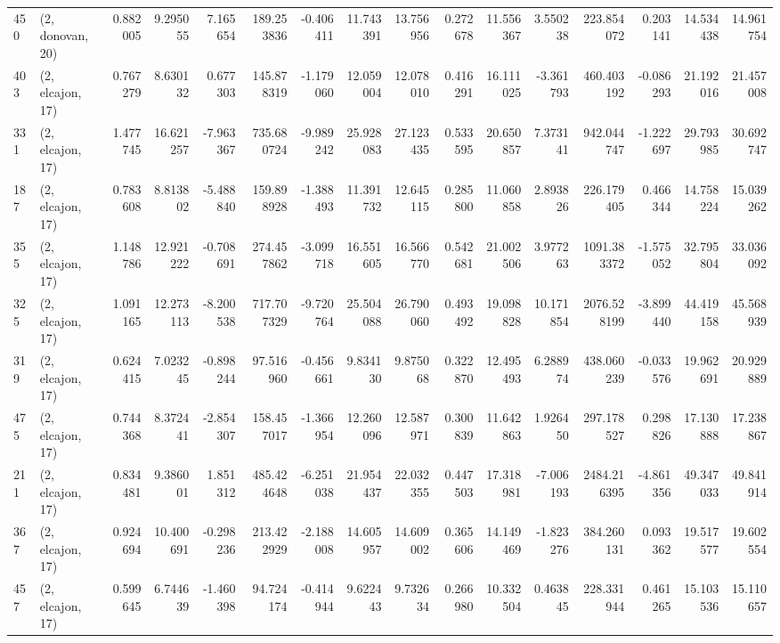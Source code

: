 \begin{tabular}{llrrrrrrrrrrrrrr}
450 &  (2, donovan, 20) &   0.882005 &   9.295055 &   7.165654 &   189.253836 &  -0.406411 &  11.743391 &  13.756956 &  0.272678 &  11.556367 &   3.550238 &   223.854072 &   0.203141 &  14.534438 &  14.961754 \\
403 &  (2, elcajon, 17) &   0.767279 &   8.630132 &   0.677303 &   145.878319 &  -1.179060 &  12.059004 &  12.078010 &  0.416291 &  16.111025 &  -3.361793 &   460.403192 &  -0.086293 &  21.192016 &  21.457008 \\
331 &  (2, elcajon, 17) &   1.477745 &  16.621257 &  -7.963367 &   735.680724 &  -9.989242 &  25.928083 &  27.123435 &  0.533595 &  20.650857 &   7.373141 &   942.044747 &  -1.222697 &  29.793985 &  30.692747 \\
187 &  (2, elcajon, 17) &   0.783608 &   8.813802 &  -5.488840 &   159.898928 &  -1.388493 &  11.391732 &  12.645115 &  0.285800 &  11.060858 &   2.893826 &   226.179405 &   0.466344 &  14.758224 &  15.039262 \\
355 &  (2, elcajon, 17) &   1.148786 &  12.921222 &  -0.708691 &   274.457862 &  -3.099718 &  16.551605 &  16.566770 &  0.542681 &  21.002506 &   3.977263 &  1091.383372 &  -1.575052 &  32.795804 &  33.036092 \\
325 &  (2, elcajon, 17) &   1.091165 &  12.273113 &  -8.200538 &   717.707329 &  -9.720764 &  25.504088 &  26.790060 &  0.493492 &  19.098828 &  10.171854 &  2076.528199 &  -3.899440 &  44.419158 &  45.568939 \\
319 &  (2, elcajon, 17) &   0.624415 &   7.023245 &  -0.898244 &    97.516960 &  -0.456661 &   9.834130 &   9.875068 &  0.322870 &  12.495493 &   6.288974 &   438.060239 &  -0.033576 &  19.962691 &  20.929889 \\
475 &  (2, elcajon, 17) &   0.744368 &   8.372441 &  -2.854307 &   158.457017 &  -1.366954 &  12.260096 &  12.587971 &  0.300839 &  11.642863 &   1.926450 &   297.178527 &   0.298826 &  17.130888 &  17.238867 \\
211 &  (2, elcajon, 17) &   0.834481 &   9.386001 &   1.851312 &   485.424648 &  -6.251038 &  21.954437 &  22.032355 &  0.447503 &  17.318981 &  -7.006193 &  2484.216395 &  -4.861356 &  49.347033 &  49.841914 \\
367 &  (2, elcajon, 17) &   0.924694 &  10.400691 &  -0.298236 &   213.422929 &  -2.188008 &  14.605957 &  14.609002 &  0.365606 &  14.149469 &  -1.823276 &   384.260131 &   0.093362 &  19.517577 &  19.602554 \\
457 &  (2, elcajon, 17) &   0.599645 &   6.744639 &  -1.460398 &    94.724174 &  -0.414944 &   9.622443 &   9.732634 &  0.266980 &  10.332504 &   0.463845 &   228.331944 &   0.461265 &  15.103536 &  15.110657 \\

\end{tabular}
